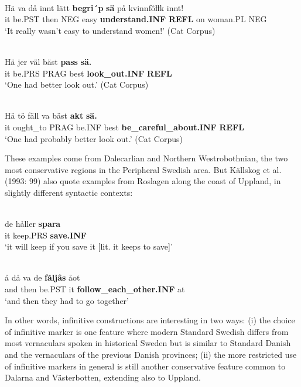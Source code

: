\ea\label{}
\\
\gll Hä  va  då  innt  lätt  \textbf{begri´p} \textbf{sä} på  kvinnfôƚƚk  innt!\\
it  be.PST  then  NEG  easy  \textbf{understand.INF} \textbf{REFL} on  woman.PL  NEG\\
\glt ‘It really wasn’t easy to understand women!’ (Cat Corpus)
\z

\ea\label{}
\\
\gll Hä  jer  väl  bäst  \textbf{pass} \textbf{sä.}\\
it  be.PRS  PRAG  best  \textbf{look\_out.INF} \textbf{REFL}\\
\glt ‘One had better look out.’ (Cat Corpus)
\z

\ea\label{}
\\
\gll Hä  tö  fäll  va  bäst  \textbf{akt}\textbf{  sä.}\\
it  ought\_to  PRAG  be.INF  best  \textbf{be\_careful\_about.INF} \textbf{REFL}\\
\glt ‘One had probably better look out.’ (Cat Corpus)
\z

These examples come from Dalecarlian and Northern Westrobothnian, the two most conservative regions in the Peripheral Swedish area. But Källskog et al. (1993: 99) also quote examples from Roslagen along the coast of Uppland, in slightly different syntactic contexts:


\ea\label{}
\\
\gll de  håller  \textbf{spara}\\
it  keep.PRS  \textbf{save.INF}\\
\glt ‘it will keep if you save it [lit. it keeps to save]’
\z

\ea\label{}
\\
\gll å  då  va  de  \textbf{fåljâs} åot\\
and  then  be.PST  it  \textbf{follow\_each\_other.INF} at\\
\glt ‘and then they had to go together’ 
\z

In other words, infinitive constructions are interesting in two ways: (i) the choice of infinitive marker is one feature where modern Standard Swedish differs from most vernaculars spoken in historical Sweden but is similar to Standard Danish and the vernaculars of the previous Danish provinces; (ii) the more restricted use of infinitive markers in general is still another conservative feature common to Dalarna and Västerbotten, extending also to Uppland. 

